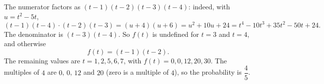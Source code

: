 The numerator factors as $(t-1)(t-2)(t-3)(t-4)$: indeed, with $u=t^2-5t$,
\[(t-1)(t-4)\cdot(t-2)(t-3)=(u+4)(u+6)=u^2+10u+24=t^4-10t^3+35t^2-50t+24.\]
The denominator is $(t-3)(t-4)$. So $f(t)$ is undefined for $t=3$ and $t=4$, and otherwise
\[f(t)=(t-1)(t-2).\]
The remaining values are $t=1,2,5,6,7$, with $f(t)=0,0,12,20,30$. The multiples of $4$ are $0$, $0$, $12$ and $20$ (zero is a multiple of $4$), so the probability is $\boxed{\dfrac45}$.
